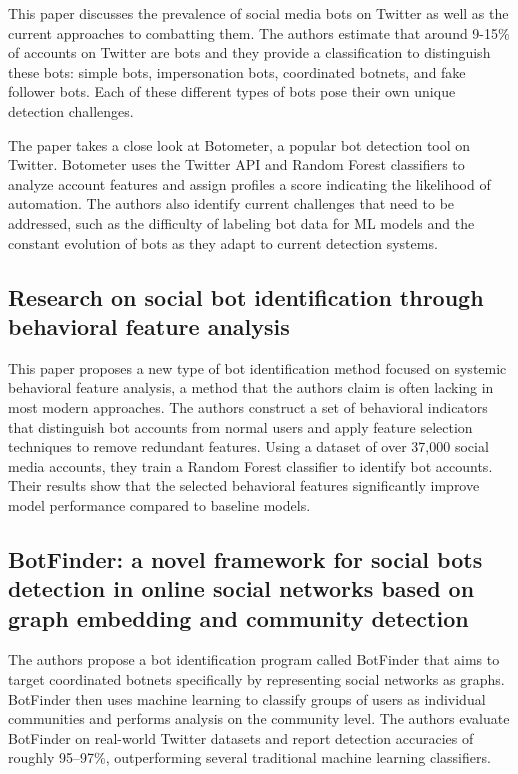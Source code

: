 This paper discusses the prevalence of social media bots on Twitter as well as the current approaches to combatting them. The authors estimate that around 9-15\% of accounts on Twitter are bots and they provide a classification to distinguish these bots: simple bots, impersonation bots, coordinated botnets, and fake follower bots. Each of these different types of bots pose their own unique detection challenges.

The paper takes a close look at Botometer, a popular bot detection tool on Twitter. Botometer uses the Twitter API and Random Forest classifiers to analyze account features and assign profiles a score indicating the likelihood of automation. The authors also identify current challenges that need to be addressed, such as the difficulty of labeling bot data for ML models and the constant evolution of bots as they adapt to current detection systems.

\subsection{Research on social bot identification through behavioral feature analysis \cite{zhang2025socialbot}}

This paper proposes a new type of bot identification method focused on systemic behavioral feature analysis, a method that the authors claim is often lacking in most modern approaches. The authors construct a set of behavioral indicators that distinguish bot accounts from normal users and apply feature selection techniques to remove redundant features. Using a dataset of over 37,000 social media accounts, they train a Random Forest classifier to identify bot accounts. Their results show that the selected behavioral features significantly improve model performance compared to baseline models.

\subsection{BotFinder: a novel framework for social bots detection in online social networks based on graph embedding and community detection \cite{li2022botfinder}}

The authors propose a bot identification program called BotFinder that aims to target coordinated botnets specifically by representing social networks as graphs. BotFinder then uses machine learning to classify groups of users as individual communities and performs analysis on the community level. The authors evaluate BotFinder on real-world Twitter datasets and report detection accuracies of roughly 95–97\%, outperforming several traditional machine learning classifiers.

